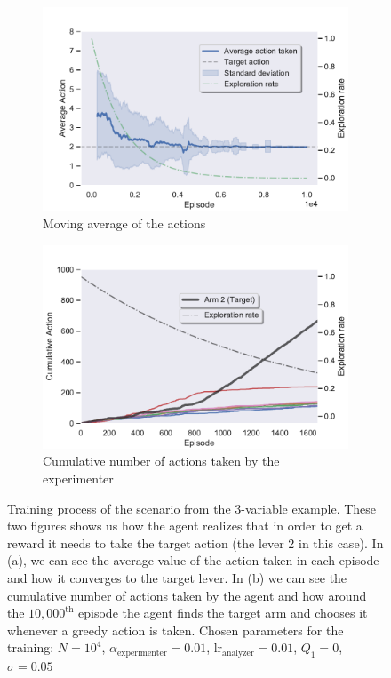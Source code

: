 \documentclass[11pt,a4paper,twoside]{report}
\newcommand{\+}{\textnormal{+} }
\theoremstyle{definition}
\numberwithin{equation}{chapter}
\begin{document}
    \begin{figure}[]
      \centering
      \begin{subfigure}{.5\textwidth}
        \centering
        \includegraphics[width=1\linewidth]{figures/Actions-MAB4.pdf}
        \caption{Moving average of the actions}
        \label{fig:ActionAverageMAB4}
      \end{subfigure}%
      \begin{subfigure}{.5\textwidth}
        \centering
        \includegraphics[width=1\linewidth]{figures/Cum-action-MAB4.pdf}
        \caption{Cumulative number of actions taken by the experimenter}
        \label{fig:actionsMAB4}
      \end{subfigure}
      \caption{Training process of the scenario from the 3-variable
      example. These two figures shows us how the agent realizes that in order
      to get a reward it needs to take the target action (the lever 2 in this
      case). In (a), we can see the average value of the action taken in each
      episode and how it converges to the target lever. In (b) we can see the
      cumulative number of actions taken by the agent and how around the
      $10,000^\text{th}$ episode the agent finds the target arm and chooses it
      whenever a greedy action is taken. Chosen parameters for the training:
      $N=10^4$, $\alpha_\text{experimenter}=0.01$,
      $\text{lr}_\text{analyzer}=0.01$, $Q_1=0$, $\sigma=0.05$}
    \end{figure}
\end{document}
